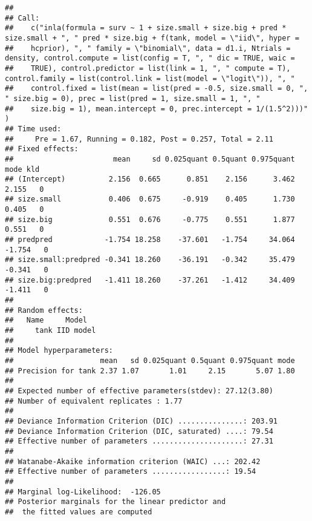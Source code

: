\documentclass[
]{article}
\newenvironment{Shaded}{\begin{snugshade}}{\end{snugshade}}
\newcommand{\FloatTok}[1]{\textcolor[rgb]{0.00,0.00,0.81}{#1}}
\newcommand{\NormalTok}[1]{#1}
\newcommand{\OperatorTok}[1]{\textcolor[rgb]{0.81,0.36,0.00}{\textbf{#1}}}
\begin{document}
\begin{verbatim}
## 
## Call:
##    c("inla(formula = surv ~ 1 + size.small + size.big + pred * size.small + ", " pred * size.big + f(tank, model = \"iid\", hyper = 
##    hcprior), ", " family = \"binomial\", data = d1.i, Ntrials = density, control.compute = list(config = T, ", " dic = TRUE, waic = 
##    TRUE), control.predictor = list(link = 1, ", " compute = T), control.family = list(control.link = list(model = \"logit\")), ", " 
##    control.fixed = list(mean = list(pred = -0.5, size.small = 0, ", " size.big = 0), prec = list(pred = 1, size.small = 1, ", " 
##    size.big = 1), mean.intercept = 0, prec.intercept = 1/(1.5^2)))" ) 
## Time used:
##     Pre = 1.67, Running = 0.182, Post = 0.257, Total = 2.11 
## Fixed effects:
##                       mean     sd 0.025quant 0.5quant 0.975quant   mode kld
## (Intercept)          2.156  0.665      0.851    2.156      3.462  2.155   0
## size.small           0.406  0.675     -0.919    0.405      1.730  0.405   0
## size.big             0.551  0.676     -0.775    0.551      1.877  0.551   0
## predpred            -1.754 18.258    -37.601   -1.754     34.064 -1.754   0
## size.small:predpred -0.341 18.260    -36.191   -0.342     35.479 -0.341   0
## size.big:predpred   -1.411 18.260    -37.261   -1.412     34.409 -1.411   0
## 
## Random effects:
##   Name     Model
##     tank IID model
## 
## Model hyperparameters:
##                    mean   sd 0.025quant 0.5quant 0.975quant mode
## Precision for tank 2.37 1.07       1.01     2.15       5.07 1.80
## 
## Expected number of effective parameters(stdev): 27.12(3.80)
## Number of equivalent replicates : 1.77 
## 
## Deviance Information Criterion (DIC) ...............: 203.91
## Deviance Information Criterion (DIC, saturated) ....: 79.54
## Effective number of parameters .....................: 27.31
## 
## Watanabe-Akaike information criterion (WAIC) ...: 202.42
## Effective number of parameters .................: 19.54
## 
## Marginal log-Likelihood:  -126.05 
## Posterior marginals for the linear predictor and
##  the fitted values are computed
\end{verbatim}

\begin{Shaded}
\end{Shaded}
\end{document}
